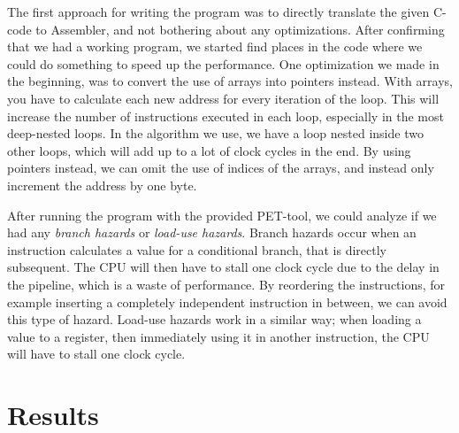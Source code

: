 \documentclass[a4paper,9pt,fleqn]{article}
\begin{document}
The first approach for writing the program was to directly translate the given C-code to Assembler,
and not bothering about any optimizations. After confirming that we had a working program, we started
find places in the code where we could do something to speed up the performance. One optimization we
made in the beginning, was to convert the use of arrays into pointers instead. With arrays, you have
to calculate each new address for every iteration of the loop. This will increase the number of
instructions executed in each loop, especially in the most deep-nested loops. In the algorithm we
use, we have a loop nested inside two other loops, which will add up to a lot of clock cycles in the
end. By using pointers instead, we can omit the use of indices of the arrays, and instead only
increment the address by one byte.

After running the program with the provided PET-tool, we could analyze if we had any {\it branch
hazards} or {\it load-use hazards}. Branch hazards occur when an instruction calculates a value
for a conditional branch, that is directly subsequent. The CPU will then have to stall one clock
cycle due to the delay in the pipeline, which is a waste of performance. By reordering the
instructions, for example inserting a completely independent instruction in between, we can avoid
this type of hazard. Load-use hazards work in a similar way; when loading a value to a register,
then immediately using it in another instruction, the CPU will have to stall one clock cycle.

\section{Results} \label{res}
\end{document}
